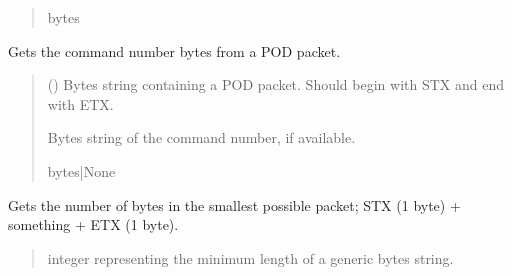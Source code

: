 \documentclass[letterpaper,10pt,english]{sphinxmanual}
\begin{document}
\begin{fulllineitems}
\begin{fulllineitems}
\begin{quote}
\begin{description}
\sphinxAtStartPar
bytes

\end{description}\end{quote}

\end{fulllineitems}


\begin{fulllineitems}
\label{\detokenize{PodApi.Packets:PodApi.Packets.Packet.Packet.GetCommandNumber}}
\pysigstartsignatures
{}
\pysigstopsignatures
\sphinxAtStartPar
Gets the command number bytes from a POD packet.
\begin{quote}\begin{description}
\sphinxAtStartPar
{} () \textendash{} Bytes string containing a POD packet. Should begin with STX and                 end with ETX.

\sphinxAtStartPar
Bytes string of the command number, if available.

\sphinxAtStartPar
bytes|None

\end{description}\end{quote}

\end{fulllineitems}


\begin{fulllineitems}
\label{\detokenize{PodApi.Packets:PodApi.Packets.Packet.Packet.GetMinimumLength}}
\pysigstartsignatures
{}
\pysigstopsignatures
\sphinxAtStartPar
Gets the number of bytes in the smallest possible packet; STX (1 byte) +         something + ETX (1 byte).
\begin{quote}\begin{description}
\sphinxAtStartPar
integer representing the minimum length of a generic bytes string.


\end{description}
\end{quote}
\end{fulllineitems}
\end{fulllineitems}
\end{document}
